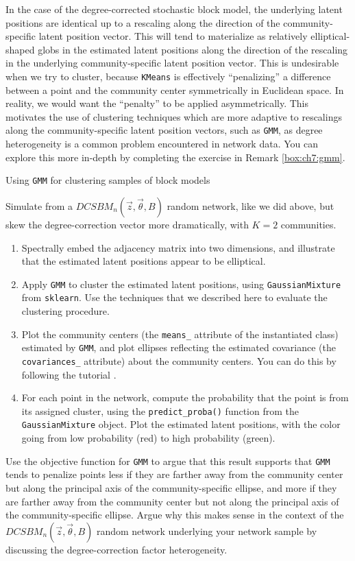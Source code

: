 In the case of the degree-corrected stochastic block model, the underlying latent positions are identical up to a rescaling along the direction of the community-specific latent position vector. This will tend to materialize as relatively elliptical-shaped globs in the estimated latent positions along the direction of the rescaling in the underlying community-specific latent position vector. This is undesirable when we try to cluster, because \texttt{KMeans} is effectively ``penalizing'' a difference between a point and the community center symmetrically in Euclidean space. In reality, we would want the ``penalty'' to be applied asymmetrically. This motivates the use of clustering techniques which are more adaptive to rescalings along the community-specific latent position vectors, such as \texttt{GMM}, as degree heterogeneity is a common problem encountered in network data. You can explore this more in-depth by completing the exercise in Remark \ref{box:ch7:gmm}.

\begin{floatingbox}[h]\caption{Using \texttt{GMM} for clustering samples of block models}
\label{box:ch7:gmm}
Simulate from a $DCSBM_n(\vec z, \vec \theta, B)$ random network, like we did above, but skew the degree-correction vector more dramatically, with $K=2$ communities. 
\begin{enumerate}
    \item Spectrally embed the adjacency matrix into two dimensions, and illustrate that the estimated latent positions appear to be elliptical.
    \item Apply \texttt{GMM} to cluster the estimated latent positions, using \texttt{GaussianMixture} from \texttt{sklearn}. Use the techniques that we described here to evaluate the clustering procedure.
    \item Plot the community centers (the \texttt{means\_} attribute of the instantiated class) estimated by \texttt{GMM}, and plot ellipses reflecting the estimated covariance (the \texttt{covariances\_} attribute) about the community centers. You can do this by following the tutorial \cite{sklearngmm_tut}.
    \item For each point in the network, compute the probability that the point is from its assigned cluster, using the \texttt{predict\_proba()} function from the \texttt{GaussianMixture} object. Plot the estimated latent positions, with the color going from low probability (red) to high probability (green).
\end{enumerate}
Use the objective function for \texttt{GMM} to argue that this result supports that \texttt{GMM} tends to penalize points less if they are farther away from the community center but along the principal axis of the community-specific ellipse, and more if they are farther away from the community center but not along the principal axis of the community-specific ellipse. Argue why this makes sense in the context of the $DCSBM_n(\vec z, \vec \theta, B)$ random network underlying your network sample by discussing the degree-correction factor heterogeneity.
\end{floatingbox}


